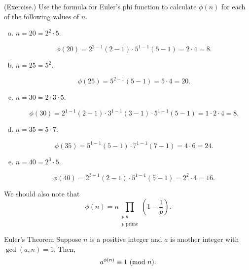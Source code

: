 \documentclass[letterpaper]{article}
\begin{document}
\begin{mdframed}
    (Exercise.) Use the formula for Euler's phi function to calculate $\phi(n)$ for each of the following values of $n$. 
    \begin{enumerate}[(a)]
        \item $n = 20 = 2^2 \cdot 5$. 
        \begin{mdframed}
            \[\phi(20) = 2^{2 - 1}(2 - 1) \cdot 5^{1 - 1}(5 - 1) = 2 \cdot 4 = 8.\]
        \end{mdframed}
        \item $n = 25 = 5^2$. 
        \begin{mdframed}
            \[\phi(25) = 5^{2 - 1}(5 - 1) = 5 \cdot 4 = 20.\]
        \end{mdframed}
        \item $n = 30 = 2 \cdot 3 \cdot 5$. 
        \begin{mdframed}
            \[\phi(30) = 2^{1 - 1}(2 - 1) \cdot 3^{1 - 1}(3 - 1) \cdot 5^{1 - 1}(5 - 1) = 1 \cdot 2 \cdot 4 = 8.\]
        \end{mdframed}
        \item $n = 35 = 5 \cdot 7$. 
        \begin{mdframed}
            \[\phi(35) = 5^{1 - 1}(5 - 1) \cdot 7^{1 - 1}(7 - 1) = 4 \cdot 6 = 24.\]
        \end{mdframed}
        \item $n = 40 = 2^3 \cdot 5$. 
        \begin{mdframed}
            \[\phi(40) = 2^{3 - 1}(2 - 1) \cdot 5^{1 - 1}(5 - 1) = 2^2 \cdot 4 = 16.\]
        \end{mdframed}
    \end{enumerate}
\end{mdframed}
We should also note that \[\phi(n) = n \prod_{\substack{p | n \\ p \text{ prime}}} \left(1 - \frac{1}{p}\right).\]

\begin{theorem}{Euler's Theorem}{}
    Suppose $n$ is a positive integer and $a$ is another integer with $\gcd(a, n) = 1$. Then, \[a^{\phi(n)} \equiv 1 \ (\mathrm{mod}\ n).\]
\end{theorem}
\end{document}
